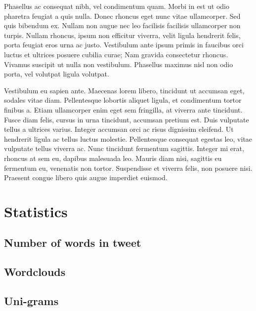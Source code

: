 \documentclass[
]{article}
\begin{document}
Phasellus ac consequat nibh, vel condimentum quam. Morbi in est ut odio
pharetra feugiat a quis nulla. Donec rhoncus eget nunc vitae
ullamcorper. Sed quis bibendum ex. Nullam non augue nec leo facilisis
facilisis ullamcorper non turpis. Nullam rhoncus, ipsum non efficitur
viverra, velit ligula hendrerit felis, porta feugiat eros urna ac justo.
Vestibulum ante ipsum primis in faucibus orci luctus et ultrices posuere
cubilia curae; Nam gravida consectetur rhoncus. Vivamus suscipit ut
nulla non vestibulum. Phasellus maximus nisl non odio porta, vel
volutpat ligula volutpat.

Vestibulum eu sapien ante. Maecenas lorem libero, tincidunt ut accumsan
eget, sodales vitae diam. Pellentesque lobortis aliquet ligula, et
condimentum tortor finibus a. Etiam ullamcorper enim eget sem fringilla,
at viverra ante tincidunt. Fusce diam felis, cursus in urna tincidunt,
accumsan pretium est. Duis vulputate tellus a ultrices varius. Integer
accumsan orci ac risus dignissim eleifend. Ut hendrerit ligula ac tellus
luctus molestie. Pellentesque consequat egestas leo, vitae vulputate
tellus viverra ac. Nunc tincidunt fermentum sagittis. Integer mi erat,
rhoncus at sem eu, dapibus malesuada leo. Mauris diam nisi, sagittis eu
fermentum eu, venenatis non tortor. Suspendisse et viverra felis, non
posuere nisi. Praesent congue libero quis augue imperdiet euismod.

\newpage

\hypertarget{statistics}{%
\section{Statistics}\label{statistics}}

\hypertarget{number-of-words-in-tweet}{%
\subsection{Number of words in tweet}\label{number-of-words-in-tweet}}

\hypertarget{wordclouds}{%
\subsection{Wordclouds}\label{wordclouds}}

\hypertarget{uni-grams}{%
\subsection{Uni-grams}\label{uni-grams}}
\end{document}
